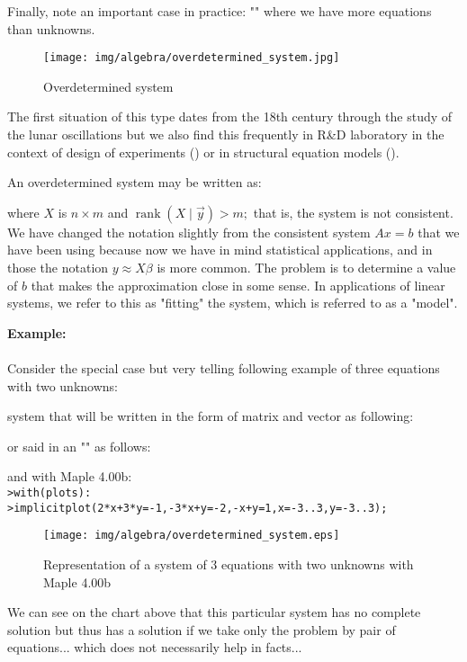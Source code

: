 	Finally, note an important case in practice: "" where we have more equations than unknowns. 
	\begin{figure}[H]
		\centering
		\texttt{[image: img/algebra/overdetermined\_system.jpg]}
		\caption{Overdetermined system}
	\end{figure}
	The first situation of this type dates from the 18th century through the study of the lunar oscillations but we also find this frequently in R\&D laboratory in the context of design of experiments () or in structural equation models ().
	
	An overdetermined system may be written as:
	
	where $X$ is $n \times m$ and $\operatorname{rank}(X \mid \vec y)>m ;$ that is, the system is not consistent. We have changed the notation slightly from the consistent system $A x=b$ that we have been using because now we have in mind statistical applications, and in those the notation $y \approx X \beta$ is more common. The problem is to determine a value of $b$ that makes the approximation close in some sense. In applications of linear systems, we refer to this as "fitting" the system, which is referred to as a "model".

	\begin{tcolorbox}[colframe=black,colback=white,sharp corners]
\textbf{{\Large {}}Example:}\\\\
Consider the special case but very telling following example of three equations with two unknowns:
	
system that will be written in the form of matrix and vector as following:
	\end{tcolorbox}

	\begin{tcolorbox}[colframe=black,colback=white,sharp corners]
	
	or said in an "" as follows:
	
	and with Maple 4.00b:\\
	
	\texttt{>with(plots):}\\
	\texttt{>implicitplot({2*x+3*y=-1,-3*x+y=-2,-x+y=1},x=-3..3,y=-3..3);}
	\begin{figure}[H]
		\centering
		\texttt{[image: img/algebra/overdetermined\_system.eps]}
		\caption{Representation of a system of 3 equations with two unknowns with Maple 4.00b}
	\end{figure}
	
	We can see on the chart above that this particular system has no complete solution but thus has a  solution if we take only the problem by pair of equations... which does not necessarily help in facts...
	\end{tcolorbox}

